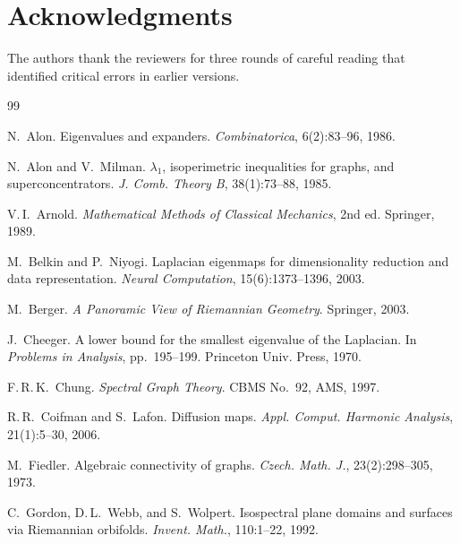 \documentclass[12pt,letterpaper]{article}
\begin{document}
\section*{Acknowledgments}
The authors thank the reviewers for three rounds of careful reading that identified critical errors in earlier versions.


\begin{thebibliography}{99}

N.~Alon.
\newblock Eigenvalues and expanders.
\newblock \emph{Combinatorica}, 6(2):83--96, 1986.

N.~Alon and V.~Milman.
\newblock $\lambda_1$, isoperimetric inequalities for graphs, and superconcentrators.
\newblock \emph{J. Comb. Theory B}, 38(1):73--88, 1985.

V.\,I.~Arnold.
\newblock \emph{Mathematical Methods of Classical Mechanics}, 2nd ed.
\newblock Springer, 1989.

M.~Belkin and P.~Niyogi.
\newblock Laplacian eigenmaps for dimensionality reduction and data representation.
\newblock \emph{Neural Computation}, 15(6):1373--1396, 2003.

M.~Berger.
\newblock \emph{A Panoramic View of Riemannian Geometry}.
\newblock Springer, 2003.

J.~Cheeger.
\newblock A lower bound for the smallest eigenvalue of the Laplacian.
\newblock In \emph{Problems in Analysis}, pp.~195--199. Princeton Univ. Press, 1970.

F.\,R.\,K.~Chung.
\newblock \emph{Spectral Graph Theory}.
\newblock CBMS No.~92, AMS, 1997.

R.\,R.~Coifman and S.~Lafon.
\newblock Diffusion maps.
\newblock \emph{Appl. Comput. Harmonic Analysis}, 21(1):5--30, 2006.

M.~Fiedler.
\newblock Algebraic connectivity of graphs.
\newblock \emph{Czech. Math. J.}, 23(2):298--305, 1973.

C.~Gordon, D.\,L.~Webb, and S.~Wolpert.
\newblock Isospectral plane domains and surfaces via Riemannian orbifolds.
\newblock \emph{Invent. Math.}, 110:1--22, 1992.


\end{thebibliography}
\end{document}
